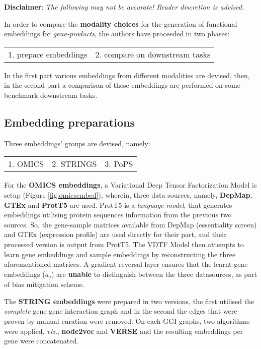 \begin{sloppypar*}

    \begin{warning}
        \textbf{Disclaimer}: \textit{The following may not be accurate! Reader
        discretion is advised.}
    \end{warning}

    \noindent In order to compare the \textbf{modality choices} for the generation
    of functional embeddings for \textit{gene-products}, the authors have proceeded
    in two phases: \hfill\break
    \begin{tabularx}{\textwidth}{XX}
        1. prepare embeddings & 2. compare on downstream tasks
    \end{tabularx} \hfill\break
    In the first part various embeddings from different modalities are devised, 
    then, in the second part a comparison of these embeddings are performed on
    some benchmark downstream tasks.

    \subsection{Embedding preparations}
    \noindent Three embeddings' groups are devised, namely:

    \begin{tabularx}{\textwidth}{XXX}
        1. OMICS & 2. STRINGS & 3. PoPS
    \end{tabularx} \hfill\break
    \noindent For the \textbf{OMICS embeddings}, a Variational Deep Tensor Factorization
    Model is setup (Figure \ref{fig:omicsembed}), wherein, three data sources,
    namely, \textbf{DepMap}, \textbf{GTEx} and \textbf{ProtT5} are used. ProtT5
    \cite{protTrans} is a \textit{language-model}, that generates embeddings
    utilising protein sequences information from the previous two sources. So,
    the gene-sample matrices available from DepMap (essentiality screen) and
    GTEx (expression profile) are used directly for their part, and their processed
    version is output from ProtT5. The VDTF Model then attempts to learn gene
    embeddings and sample embeddings by reconstructing the three aforementioned
    matrices. A gradient reversal layer \cite{revGrad} ensures that the learnt
    gene embeddings ($a_j$) are \textbf{unable} to distinguish between the three
    datasources, as part of bias mitigation scheme. \hfill\break

    \noindent The \textbf{STRING embeddings} were prepared in two versions, the
    first utilised the \textit{complete} gene-gene interaction graph and in the
    second the edges that were proven by manual curation were removed. On each
    GGI graphs, two algorithms were applied, \textit{viz.}, \textbf{node2vec}
    and \textbf{VERSE} and the resulting embeddings per gene were concatenated. \hfill\break


\end{sloppypar*}
